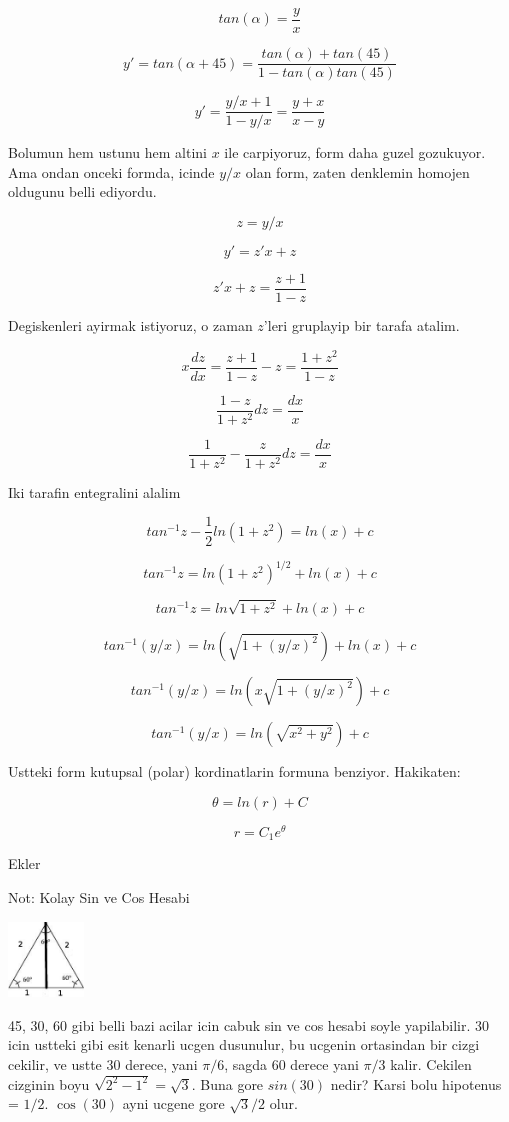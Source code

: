 \documentclass[12pt,fleqn]{article}\usepackage{../common}
\begin{document}
\[ tan (\alpha) = \frac{y}{x} \]

\[ y' = tan(\alpha + 45) = \frac{tan(\alpha) + tan(45)}{1 - tan(\alpha)tan(45)} \]

\[ y' = \frac{y/x + 1}{1-y/x} =  \frac{y+x}{x-y} \]

Bolumun hem ustunu hem altini $x$ ile carpiyoruz, form daha guzel
gozukuyor. Ama ondan onceki formda, icinde $y/x$ olan form, zaten
denklemin homojen oldugunu belli ediyordu. 

\[ z = y/x \]

\[ y' = z'x + z \]

\[ z'x +z = \frac{z+1}{1-z} \]

Degiskenleri ayirmak istiyoruz, o zaman $z$'leri gruplayip bir tarafa
atalim. 

\[ x \frac{dz}{dx} = \frac{z+1}{1-z} - z = \frac{1+z^2}{1-z} \]

\[ \frac{1-z}{1+z^2}dz = \frac{dx}{x} \]

\[ \frac{1}{1+z^2} - \frac{z}{1+z^2} dz = \frac{dx}{x} \]


Iki tarafin entegralini alalim

\[ tan^{-1}z - \frac{1}{2} ln (1+z^2) = ln(x) + c \]

\[ tan^{-1}z = ln (1+z^2)^{1/2} + ln(x) + c \]

\[ tan^{-1}z = ln \sqrt{1+z^2} + ln(x) + c \]

\[ tan^{-1}(y/x) = ln (\sqrt{1+(y/x)^2}) + ln(x) + c \]

\[ tan^{-1}(y/x) = ln(x \sqrt{1+(y/x)^2}) + c \]

\[ tan^{-1}(y/x) = ln(\sqrt{x^2+y^2}) + c \]

Ustteki form kutupsal (polar) kordinatlarin formuna benziyor. Hakikaten:

\[ \theta = ln(r) + C \]

\[ r = C_1e^{\theta} \]

Ekler

Not: Kolay Sin ve Cos Hesabi

\includegraphics[height=2cm]{4_3.png}

45, 30, 60 gibi belli bazi acilar icin cabuk sin ve cos hesabi soyle
yapilabilir. 30 icin ustteki gibi esit kenarli ucgen dusunulur, bu ucgenin
ortasindan bir cizgi cekilir, ve ustte 30 derece, yani $\pi/6$, sagda 60
derece yani $\pi/3$ kalir. Cekilen cizginin boyu $\sqrt{2^2 - 1^2} =
\sqrt{3}$. Buna  gore $sin(30)$ nedir? Karsi bolu hipotenus = $1/2$. $\cos(30)$ ayni ucgene 
gore $\sqrt{3}/2$ olur.
\end{document}

